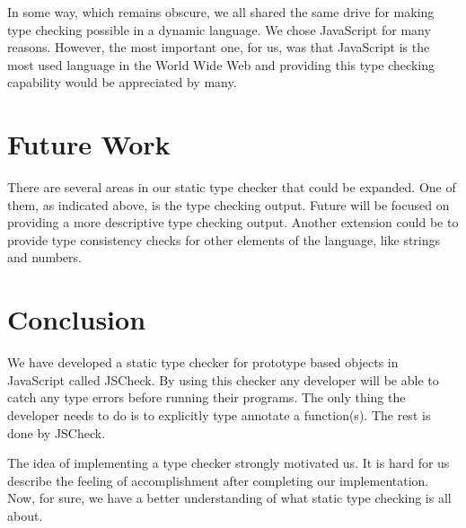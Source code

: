 \documentclass{article}
\begin{document}
In some way, which remains obscure, we all shared the same drive for making type 
checking possible in a dynamic language. We chose JavaScript for many reasons. 
However, the most important one, for us, was that JavaScript is the most used 
language in the World Wide Web and providing this type checking capability would
be appreciated by many. 

\section{Future Work}
There are several areas in our static type checker that could be expanded. One of
them, as indicated above, is the type checking output. Future will be focused on 
providing a more descriptive type checking output. Another extension could be to
provide type consistency checks for other elements of the language, like strings
and numbers.


\section{Conclusion}
We have developed a static type checker for prototype based objects in JavaScript
called JSCheck. By using this checker any developer will be able to catch any 
type errors before running their programs. The only thing the developer needs to
do is to explicitly type annotate a function(s). The rest is done by JSCheck. 

The idea of implementing a type checker strongly motivated us. It is hard for us 
describe the feeling of accomplishment after completing our implementation. Now,
for sure, we have a better understanding of what static type checking is all about. 



\end{document}
